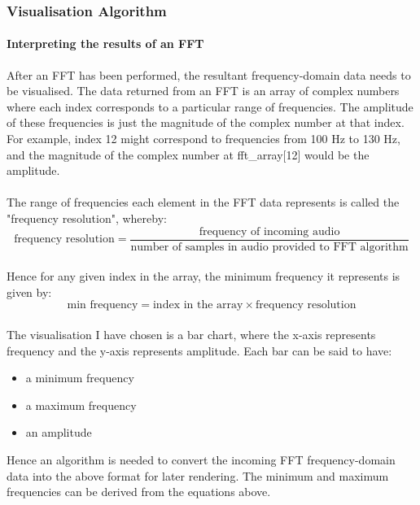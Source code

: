 \pagebreak
\subsubsection{Visualisation Algorithm}

\paragraph{Interpreting the results of an FFT}
After an FFT has been performed, the resultant frequency-domain data needs to be visualised. The data returned from an FFT is an array of complex numbers where each index corresponds to a particular range of frequencies. The amplitude of these frequencies is just the magnitude of the complex number at that index. For example, index 12 might correspond to frequencies from 100 Hz to 130 Hz, and the magnitude of the complex number at fft\_array[12] would be the amplitude.

\paragraph{}
The range of frequencies each element in the FFT data represents is called the "frequency resolution", whereby:
\[
\text{frequency resolution} = \frac{\text{frequency of incoming audio}}{\text{number of samples in audio provided to FFT algorithm}}
\]

\paragraph{}
Hence for any given index in the array, the minimum frequency it represents is given by:
\[
	\text{min frequency} = \text{index in the array} \times \text{frequency resolution}
\]

\paragraph{}
The visualisation I have chosen is a bar chart, where the x-axis represents frequency and the y-axis represents amplitude. Each bar can be said to have:
\begin{itemize}
	\item a minimum frequency
	\item a maximum frequency
	\item an amplitude
\end{itemize}
Hence an algorithm is needed to convert the incoming FFT frequency-domain data into the above format for later rendering. The minimum and maximum frequencies can be derived from the equations above.

